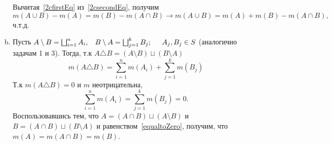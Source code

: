 \begin{solution}
\begin{enumerate}[(a)]
    Вычитая~\eqref{2cfirstEq} из~\eqref{2csecondEq}, получим
    \begin{equation*}
        m(A \cup B) - m(A) = m(B) - m(A \cap B) \rightarrow m(A \cup B) = m(A) + m(B) - m(A\cap B),
    \end{equation*}
    ч.т.д.
    \item Пусть $A \setminus B = \bigsqcup_{i = 1}^{n} A_i,\hspace{3mm} B \setminus A = \bigsqcup_{j = 1}^{k} B_j; \hspace{5mm}A_j, B_j \in S$ (аналогично задачам 1 и 3). Тогда, т.к $A \triangle B  = (A \setminus B) \sqcup (B \setminus A)$
    \begin{equation*}
        m(A \triangle B) = \sum_{i = 1}^{n} m(A_i) + \sum_{j = 1}^{k} m(B_j)
    \end{equation*}
    Т.к $m(A \triangle B) = 0$ и $m$ неотрицательна,
    \begin{equation}\label{equaltoZero}
    \sum_{i = 1}^{n} m(A_i) = \sum_{j = 1}^{k} m(B_j) = 0.
    \end{equation}
    Воспользовавшись тем, что $A = (A \cap B) \sqcup (A \setminus B)$ и $B = (A \cap B) \sqcup (B \setminus A)$ и равенством~\eqref{equaltoZero}, получим, что $m(A) = m(A\cap B) = m(B)$.
\end{enumerate}
\end{solution}